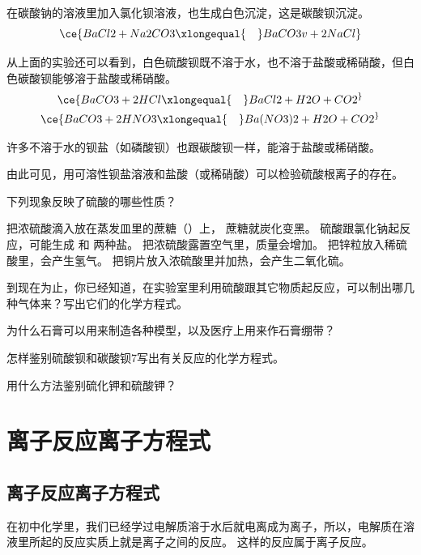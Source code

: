 在碳酸钠的溶液里加入氯化钡溶液，也生成白色沉淀，这是碳酸钡沉淀。
\[ \ce{ BaCl2 + Na2CO3 \xlongequal{\quad} BaCO3 v + 2NaCl }\]

从上面的实验还可以看到，白色硫酸钡既不溶于水，也不溶于盐酸或稀硝酸，但白色碳酸钡能够溶于盐酸或稀硝酸。
\begin{gather*}
  \ce{ BaCO3 + 2HCl \xlongequal{\quad} BaCl2 + H2O + CO2 ^ }\\
  \ce{ BaCO3 + 2HNO3 \xlongequal{\quad} Ba(NO3)2 + H2O + CO2 ^ }
\end{gather*}

许多不溶于水的钡盐（如磷酸钡）也跟碳酸钡一样，能溶于盐酸或稀硝酸。

由此可见，用可溶性钡盐溶液和盐酸（或稀硝酸）可以检验硫酸根离子的存在。

\begin{Practice}[习题]
  \begin{question}
    \item 下列现象反映了硫酸的哪些性质？
    \begin{tasks}[label=(\arabic*)]
      \task 把浓硫酸滴入放在蒸发皿里的蔗糖（）上， 蔗糖就炭化变黑。
      \task 硫酸跟氯化钠起反应，可能生成  和  两种盐。
      \task 把浓硫酸露置空气里，质量会增加。
      \task 把锌粒放入稀硫酸里，会产生氢气。
      \task 把铜片放入浓硫酸里并加热，会产生二氧化硫。
    \end{tasks}
    \item 到现在为止，你已经知道，在实验室里利用硫酸跟其它物质起反应，可以制出哪几种气体来？写出它们的化学方程式。
    \item 为什么石膏可以用来制造各种模型，以及医疗上用来作石膏绷带？
    \item 怎样鉴别硫酸钡和碳酸钡7写出有关反应的化学方程式。
    \item 用什么方法鉴别硫化钾和硫酸钾？
  \end{question}
\end{Practice}

\section{离子反应\texorpdfstring{\quad}{ }离子方程式}
\subsection{离子反应\texorpdfstring{\quad}{ }离子方程式}
在初中化学里，我们已经学过电解质溶于水后就电离成为离子，所以，电解质在溶液里所起的反应实质上就是离子之间的反应。
这样的反应属于离子反应。

